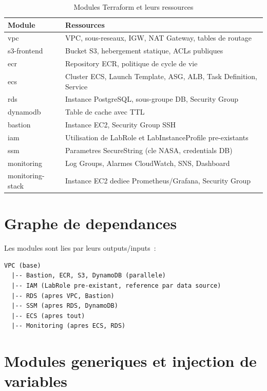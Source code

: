 \begin{table}[H]
    \centering
    \begin{tabularx}{\textwidth}{lX}
        \toprule
        \textbf{Module} & \textbf{Ressources} \\
        \midrule
        vpc & VPC, sous-reseaux, IGW, NAT Gateway, tables de routage \\
        s3-frontend & Bucket S3, hebergement statique, ACLs publiques \\
        ecr & Repository ECR, politique de cycle de vie \\
        ecs & Cluster ECS, Launch Template, ASG, ALB, Task Definition, Service \\
        rds & Instance PostgreSQL, sous-groupe DB, Security Group \\
        dynamodb & Table de cache avec TTL \\
        bastion & Instance EC2, Security Group SSH \\
        iam & Utilisation de LabRole et LabInstanceProfile pre-existants \\
        ssm & Parametres SecureString (cle NASA, credentials DB) \\
        monitoring & Log Groups, Alarmes CloudWatch, SNS, Dashboard \\
        monitoring-stack & Instance EC2 dediee Prometheus/Grafana, Security Group \\
        \bottomrule
    \end{tabularx}
    \caption{Modules Terraform et leurs ressources}
\end{table}

\section{Graphe de dependances}

Les modules sont lies par leurs outputs/inputs~:

\begin{lstlisting}[language={},caption={Ordre de deploiement}]
VPC (base)
  |-- Bastion, ECR, S3, DynamoDB (parallele)
  |-- IAM (LabRole pre-existant, reference par data source)
  |-- RDS (apres VPC, Bastion)
  |-- SSM (apres RDS, DynamoDB)
  |-- ECS (apres tout)
  |-- Monitoring (apres ECS, RDS)
\end{lstlisting}

\section{Modules generiques et injection de variables}


